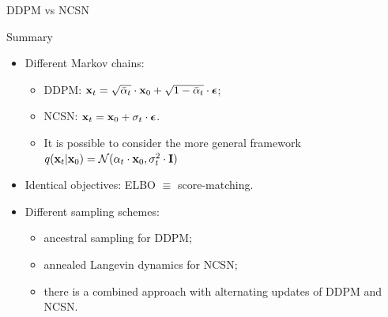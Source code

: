 \begin{frame}{DDPM vs NCSN}
	\begin{block}{Summary}
		\begin{itemize}
		\item Different Markov chains:
			\begin{itemize}
				\item DDPM: $\mathbf{x}_t = \sqrt{\bar{\alpha}_t} \cdot \mathbf{x}_0 + \sqrt{1 - \bar{\alpha}_t} \cdot \boldsymbol{\epsilon}$;
				\item NCSN: $\mathbf{x}_t = \mathbf{x}_0 + \sigma_t \cdot \boldsymbol{\epsilon}$.
				\item It is possible to consider the more general framework $q(\mathbf{x}_t |\mathbf{x}_0) = \mathcal{N}(\alpha_t \cdot \mathbf{x}_0, \sigma^2_t\cdot \mathbf{I})$
			\end{itemize}
		\item Identical objectives: ELBO $\equiv$ score-matching.
		\item Different sampling schemes:
			\begin{itemize}
				\item ancestral sampling for DDPM;
				\item annealed Langevin dynamics for NCSN;
				\item there is a combined approach with alternating updates of DDPM and NCSN.
			\end{itemize}
		\end{itemize}
	\end{block}
\end{frame}
